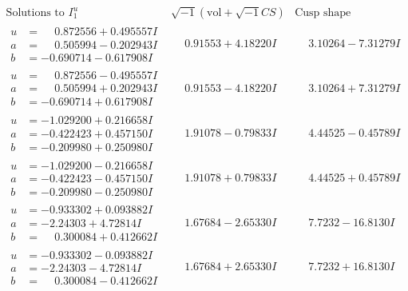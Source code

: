 \documentclass[1p]{elsarticle_modified}
\theoremstyle{definition}
\newcommand{\I}{\sqrt{-1}}
\begin{document}
$$\begin{array}{c|c|c}  
\text{Solutions to }I^u_{1}& \I (\text{vol} + \sqrt{-1}CS) & \text{Cusp shape}\\
 \hline 
\begin{aligned}
u &= \phantom{-}0.872556 + 0.495557 I \\
a &= \phantom{-}0.505994 - 0.202943 I \\
b &= -0.690714 - 0.617908 I\end{aligned}
 & \phantom{-}0.91553 + 4.18220 I & \phantom{-}3.10264 - 7.31279 I \\ \hline\begin{aligned}
u &= \phantom{-}0.872556 - 0.495557 I \\
a &= \phantom{-}0.505994 + 0.202943 I \\
b &= -0.690714 + 0.617908 I\end{aligned}
 & \phantom{-}0.91553 - 4.18220 I & \phantom{-}3.10264 + 7.31279 I \\ \hline\begin{aligned}
u &= -1.029200 + 0.216658 I \\
a &= -0.422423 + 0.457150 I \\
b &= -0.209980 + 0.250980 I\end{aligned}
 & \phantom{-}1.91078 - 0.79833 I & \phantom{-}4.44525 - 0.45789 I \\ \hline\begin{aligned}
u &= -1.029200 - 0.216658 I \\
a &= -0.422423 - 0.457150 I \\
b &= -0.209980 - 0.250980 I\end{aligned}
 & \phantom{-}1.91078 + 0.79833 I & \phantom{-}4.44525 + 0.45789 I \\ \hline\begin{aligned}
u &= -0.933302 + 0.093882 I \\
a &= -2.24303 + 4.72814 I \\
b &= \phantom{-}0.300084 + 0.412662 I\end{aligned}
 & \phantom{-}1.67684 - 2.65330 I & \phantom{-}7.7232 - 16.8130 I \\ \hline\begin{aligned}
u &= -0.933302 - 0.093882 I \\
a &= -2.24303 - 4.72814 I \\
b &= \phantom{-}0.300084 - 0.412662 I\end{aligned}
 & \phantom{-}1.67684 + 2.65330 I & \phantom{-}7.7232 + 16.8130 I \\ \hline\begin{aligned}

\end{aligned}
\end{array}$$
\end{document}
